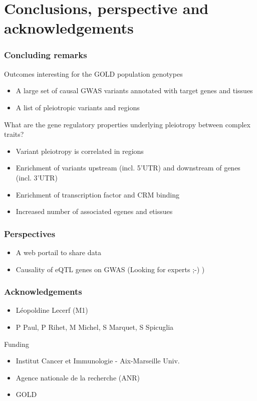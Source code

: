 \documentclass{beamer}
\begin{document}
\section{Conclusions, perspective and acknowledgements} %

\begin{frame}
\frametitle{Concluding remarks}

Outcomes interesting for the GOLD population genotypes
%
\begin{itemize}
\item A large set of causal GWAS variants annotated with target genes and tissues
\item A list of pleiotropic variants and regions
\end{itemize}
%
\vfill
%
What are the gene regulatory properties underlying pleiotropy between complex traits?
%
\begin{itemize}
\item Variant pleiotropy is correlated in regions
\item Enrichment of variants upstream (incl. 5'UTR) and downstream of genes (incl. 3'UTR)
\item Enrichment of transcription factor and CRM binding
\item Increased number of associated egenes and etissues
\end{itemize}


\end{frame}

\begin{frame}
\frametitle{Perspectives}


\begin{itemize}
\item A web portail to share data
\item Causality of eQTL genes on GWAS (Looking for experts ;-) )
\end{itemize}

\end{frame}

\begin{frame}
\frametitle{Acknowledgements}

\begin{itemize}
\item L\'eopoldine Lecerf (M1)
\item P Paul, P Rihet, M Michel, S Marquet, S Spicuglia
\end{itemize}
%
\vfill
%
Funding
%
\begin{itemize}
\item Institut Cancer et Immunologie - Aix-Marseille Univ.
\item Agence nationale de la recherche (ANR)
\item GOLD
\end{itemize}

\end{frame}
\end{document}
